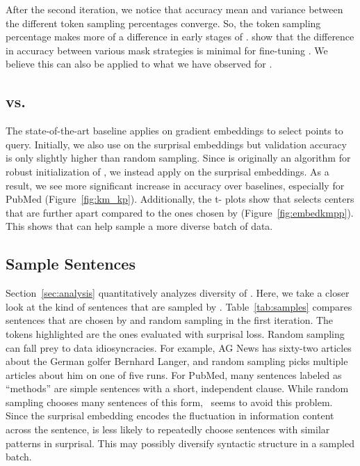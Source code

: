 After the
second \al{} iteration, we notice that accuracy mean and variance between the
different token sampling percentages converge.  So, the token sampling
percentage makes more of a difference in early stages of \al.
\citet{devlin-2019} show that the difference in accuracy between various mask strategies is
minimal for fine-tuning \bert.  We believe this can also be applied to what we
have observed for \alps.



\subsection{\km{} vs. \kmpp{}}
\label{ssec:km}
The state-of-the-art baseline \badge{} applies \kmpp{} on gradient
embeddings to select points to query.  Initially, we also use \kmpp{} on the
surprisal embeddings but validation accuracy is only slightly higher
than random sampling.  Since \kmpp{} is originally an algorithm for robust
initialization of \km{}, we instead apply \km{} on the surprisal embeddings.  As
a result, we see more significant increase in accuracy over baselines,
especially for PubMed (Figure~\ref{fig:km_kp}).  Additionally, the t- plots
show that \km{} selects centers that are further apart compared to the
ones chosen by \kmpp{} (Figure~\ref{fig:embedkmpp}).  This shows that \km{} can help sample a more diverse
batch of data.


\subsection{Sample Sentences}


Section~\ref{sec:analysis} quantitatively analyzes diversity of
\alps{}.  Here, we take a closer look at the kind of sentences that are sampled
by \alps{}.
Table~\ref{tab:samples} compares sentences that are chosen by \alps{} and random
sampling
in the first  iteration.  The tokens highlighted are the ones
evaluated with surprisal loss.
Random sampling can fall prey to data idiosyncracies. For example, AG News has
sixty-two articles about the German golfer Bernhard Langer, and random sampling
picks multiple articles about him on one of five runs.
For PubMed, many sentences labeled as ``methods'' are simple sentences
with a short, independent clause.  While random sampling chooses many
sentences of this form, \alps~seems to avoid this problem.
Since the surprisal embedding encodes the fluctuation in information
content across the sentence, \alps{} is less likely to repeatedly choose
sentences with similar patterns in surprisal.  This may possibly diversify
syntactic structure in a sampled batch.
